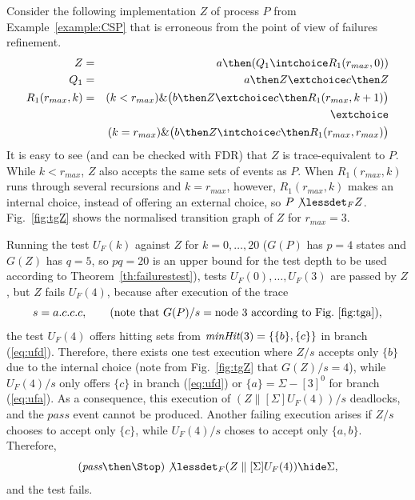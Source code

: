 \begin{example}
\label{ex:uf1tests} Consider the following implementation $Z$ of process $P$
from Example~\ref{example:CSP} that is erroneous from the point of view of
failures refinement.
\begin{eqnarray*}
Z & = & a \then (Q_1 \intchoice R_1(r_{max},0))
\\
Q_1 & = & a\then Z \extchoice c\then Z
\\
R_1(r_{max},k) & = & (k < r_{max}) \& \big(b\then Z \extchoice  c\then R_1(r_{max},k+1)\big)
\\ & & \extchoice
\\ & & (k = r_{max}) \& \big(b\then Z \intchoice c\then R_1(r_{max},r_{max})\big)
\end{eqnarray*}
It is easy to see (and can be checked with FDR) that $Z$ is trace-equivalent
to $P$. While $k < r_{max}$, $Z$ also accepts the same sets of events as $P$.
When $R_1(r_{max},k)$ runs through several recursions and $k = r_{max}$,
however, $R_1(r_{max},k)$ makes an internal choice, instead of offering an
external choice, so $P\not\lessdet_F Z$. Fig.~\ref{fig:tgZ} shows the
normalised transition graph of $Z$ for $r_{max} = 3$.
 

Running the test $U_F(k)$ against $Z$ for $k=0,\dots,20$ ($G(P)$ has $p = 4$
states and $G(Z)$ has $q=5$, so $pq=20$ is an upper bound for the test depth
to be used according to Theorem~\ref{th:failurestest}), tests $U_F(0),\dots,
U_F(3)$ are passed by $Z$, but $Z$ fails $U_F(4)$, because after execution of
the trace
\[
s = a.c.c.c, \qquad\text{(note that $G(P)/s = \text{node}\ 3$ according to Fig.~\ref{fig:tga})},
\]
the test $U_F(4)$ offers hitting sets from $\text{\it minHit}(3) = \{\{b\},\{c\}\}$
in branch (\ref{eq:ufd}). Therefore,  there exists one test execution
where $Z/s$ accepts only $\{b\}$ due to the internal choice (note
from Fig.~\ref{fig:tgZ} that
$G(Z)/s = 4$), while $U_F(4)/s$
only offers $\{c\}$ in branch (\ref{eq:ufd}) or $\{ a\} = \Sigma - [3]^0$ for
branch (\ref{eq:ufa}).  As a consequence, this execution of
$(Z\parallel[\Sigma] U_F(4))/s$ deadlocks, and the $pass$ event cannot be
produced. Another failing execution arises if $Z/s$ chooses to accept only
$\{c \}$, while $U_F(4)/s$ choses to accept only $\{a,b\}$. Therefore,
\[
(\epass\then \Stop)\not\lessdet_F  (Z\parallel[\Sigma] U_F(4)) \hide\Sigma,
\]
and the test fails. \xbox
\end{example}
 
